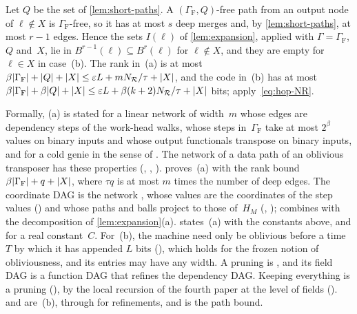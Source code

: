 \begin{outline}
Let $Q$ be the set of \cref{lem:short-paths}. A $(\Gamma_{\mathrm F},Q)$-free path from an output node of $\ell\notin X$ is
$\Gamma_{\mathrm F}$-free, so it has at most $s$ deep merges and, by \cref{lem:short-paths}, at most $r-1$ edges. Hence
the sets $I(\ell)$ of \cref{lem:expansion}, applied with $\Gamma=\Gamma_{\mathrm F}$, $Q$ and~$X$, lie in
$B^{r-1}(\ell)\subseteq B^r(\ell)$ for $\ell\notin X$, and they are empty for $\ell\in X$ in case~(b). The rank in~(a) is
at most $\beta\lvert \Gamma_{\mathrm F} \rvert+\lvert Q \rvert+\lvert X \rvert\le\varepsilon L+mN_{\mathcal R}/\tau+\lvert X \rvert$, and the code in~(b) has at
most $\beta\lvert \Gamma_{\mathrm F} \rvert+\beta\lvert Q \rvert+\lvert X \rvert\le\varepsilon L+\beta(k+2)N_{\mathcal R}/\tau+\lvert X \rvert$ bits;
apply~\eqref{eq:hop-NR}.

Formally, (a) is stated for a linear network of width~$m$ whose edges are dependency steps of the work-head walks, whose
steps in~$\Gamma_{\mathrm F}$ take at most $2^\beta$ values on binary inputs and whose output functionals transpose on
binary inputs, and for a cold genie in the sense of . The network
 of a data path of an oblivious transposer has these properties
(, ,
).  proves~(a) with the rank bound
$\beta\lvert \Gamma_{\mathrm F} \rvert+q+\lvert X \rvert$, where $\tau q$ is at most $m$ times the number of deep edges. The coordinate
DAG is the network , whose values are the coordinates of the step values
() and whose paths and balls project to those of~$H_M$ (,
);  combines  with the
decomposition  of \cref{lem:expansion}(a).  states~(a)
with the constants above, and  for a real constant~$C$. For~(b), the machine
need only be oblivious before a time~$T$ by which it has appended $L$ bits (), which
holds for the frozen notion of obliviousness, and its entries may have any width. A pruning is
, and its field DAG  is a function DAG that refines the
dependency DAG. Keeping everything is a pruning (), by the local recursion of the fourth
paper at the level of fields ().  and
 are~(b), through  for refinements, and
 is the path bound.


\end{outline}
